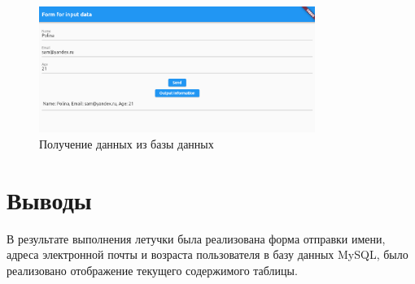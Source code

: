 \documentclass[a4paper, 14pt]{extarticle}
\begin{document}
\begin{figure}[!htb]
	\centering
	\includegraphics[width=0.8\textwidth]{img3}
\caption{Получение данных из базы данных}
\label{fig:img3}
\end{figure}

\section{Выводы}\label{Sect::conclusion}

В результате выполнения летучки была реализована форма отправки имени, адреса электронной почты и возраста пользователя в базу данных MySQL, было реализовано отображение текущего содержимого таблицы.
\end{document}
